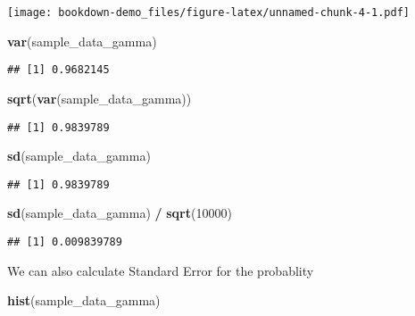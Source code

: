 \documentclass[]{book}
\newenvironment{Shaded}{\begin{snugshade}}{\end{snugshade}}
\newcommand{\DecValTok}[1]{\textcolor[rgb]{0.00,0.00,0.81}{#1}}
\newcommand{\KeywordTok}[1]{\textcolor[rgb]{0.13,0.29,0.53}{\textbf{#1}}}
\newcommand{\NormalTok}[1]{#1}
\newcommand{\OperatorTok}[1]{\textcolor[rgb]{0.81,0.36,0.00}{\textbf{#1}}}
\newcommand{\StringTok}[1]{\textcolor[rgb]{0.31,0.60,0.02}{#1}}
\begin{document}
\texttt{[image: bookdown-demo\_files/figure-latex/unnamed-chunk-4-1.pdf]}

\begin{Shaded}
\begin{Highlighting}[]
\KeywordTok{var}\NormalTok{(sample_data_gamma)}
\end{Highlighting}
\end{Shaded}

\begin{verbatim}
## [1] 0.9682145
\end{verbatim}

\begin{Shaded}
\begin{Highlighting}[]
\KeywordTok{sqrt}\NormalTok{(}\KeywordTok{var}\NormalTok{(sample_data_gamma))}
\end{Highlighting}
\end{Shaded}

\begin{verbatim}
## [1] 0.9839789
\end{verbatim}

\begin{Shaded}
\begin{Highlighting}[]
\KeywordTok{sd}\NormalTok{(sample_data_gamma) }
\end{Highlighting}
\end{Shaded}

\begin{verbatim}
## [1] 0.9839789
\end{verbatim}

\begin{Shaded}
\begin{Highlighting}[]
\KeywordTok{sd}\NormalTok{(sample_data_gamma) }\OperatorTok{/}\StringTok{ }\KeywordTok{sqrt}\NormalTok{(}\DecValTok{10000}\NormalTok{)}
\end{Highlighting}
\end{Shaded}

\begin{verbatim}
## [1] 0.009839789
\end{verbatim}

We can also calculate Standard Error for the probablity

\begin{Shaded}
\begin{Highlighting}[]
\KeywordTok{hist}\NormalTok{(sample_data_gamma)}
\end{Highlighting}
\end{Shaded}
\end{document}
